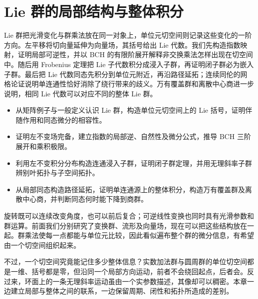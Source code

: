 
% 
% 

\chapter{Lie 群的局部结构与整体积分}
\label{g1:ch:16}

\begin{chapterabstract}
	Lie 群把光滑变化与群乘法放在同一对象上，单位元切空间则记录这些变化的一阶方向。左平移将切向量延伸为向量场，其括号给出 Lie 代数。我们先构造指数映射，证明局部可逆性，并以 BCH 的有限阶展开解释非交换乘法怎样出现在切空间中。随后用 Frobenius 定理把 Lie 子代数积分成浸入子群，再证明闭子群必为嵌入子群。最后把 Lie 代数同态先积分到单位元附近，再沿路径延拓；连续同伦的网格论证说明单连通性恰好消除了绕行带来的歧义。万有覆盖群和离散中心商进一步说明，相同 Lie 代数可以对应不同的整体 Lie 群。
\end{chapterabstract}

\begin{learninggoals}
	\begin{itemize}
		\item 从矩阵例子与一般定义认识 Lie 群，构造单位元切空间上的 Lie 括号，证明伴随作用和同态微分的相容性。
		\item 证明左不变场完备，建立指数的局部逆、自然性及微分公式，推导 BCH 三阶展开和乘积极限。
		\item 利用左不变积分分布构造连通浸入子群，证明闭子群定理，并用无理斜率子群辨别叶拓扑与子空间拓扑。
		\item 从局部同态构造路径延拓，证明单连通源上的整体积分，构造万有覆盖群及离散中心商，并判断同态何时能下降到商群。
	\end{itemize}
\end{learninggoals}

旋转既可以连续改变角度，也可以前后复合；可逆线性变换也同时具有光滑参数和群运算。前面我们分别研究了变换群、流形及向量场，现在可以把这些结构放在一起。群乘法使每一点都能与单位元比较，因此看似遍布整个群的微分信息，有希望由一个切空间组织起来。

\ProseParagraphBreak

不过，一个切空间究竟能记住多少整体信息？实数加法群与圆周群的单位切空间都是一维、括号都是零，但沿同一个局部方向运动，前者不会绕回起点，后者会。反过来，环面上的一条无理斜率运动虽由一个实参数描述，其像却可以稠密。本章一边建立局部与整体之间的联系，一边保留周期、闭性和拓扑所造成的差别。

